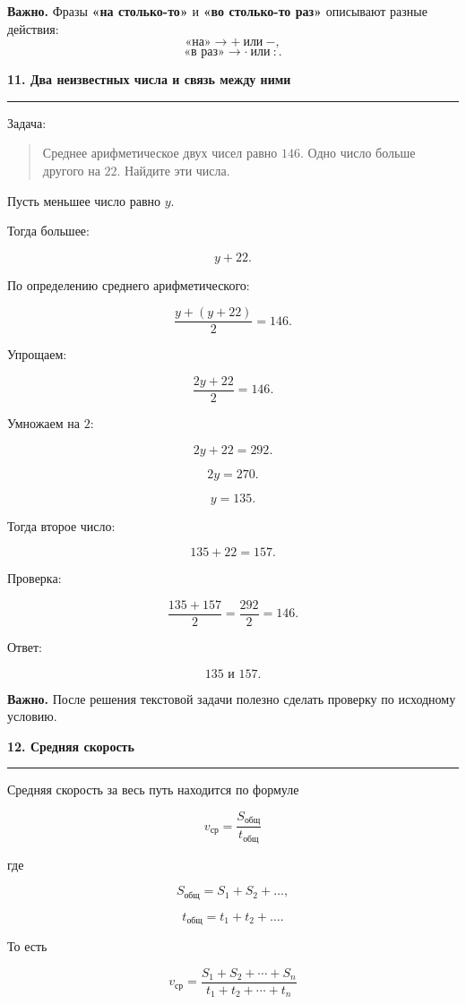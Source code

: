 \documentclass[a4paper,12pt]{article}
\newcommand{\topic}[1]{%
  \vspace{0.7em}
  {\Large\bfseries\color{darkaccent}#1}\par
  \vspace{0.25em}
  {\color{accent}\rule{\linewidth}{0.5pt}}
  \vspace{0.55em}
}
\newcommand{\important}[1]{%
  \par
  \vspace{0.25em}
  \noindent
  \textcolor{darkaccent}{\textbf{Важно.}} #1
  \par
}
\begin{document}
\important{
Фразы \textbf{«на столько-то»} и \textbf{«во столько-то раз»}
описывают разные действия:
\[
\text{«на»} \longrightarrow +\ \text{или}\ -,
\]
\[
\text{«в раз»} \longrightarrow \cdot\ \text{или}\ :.
\]
}

\topic{11. Два неизвестных числа и связь между ними}

Задача:

\begin{quote}
Среднее арифметическое двух чисел равно $146$.
Одно число больше другого на $22$.
Найдите эти числа.
\end{quote}

Пусть меньшее число равно $y$.

Тогда большее:

\[
y+22.
\]

По определению среднего арифметического:

\[
\frac{y+(y+22)}{2}=146.
\]

Упрощаем:

\[
\frac{2y+22}{2}=146.
\]

Умножаем на $2$:

\[
2y+22=292.
\]

\[
2y=270.
\]

\[
y=135.
\]

Тогда второе число:

\[
135+22=157.
\]

Проверка:

\[
\frac{135+157}{2}
=
\frac{292}{2}
=
146.
\]

Ответ:

\[
\boxed{135\text{ и }157}.
\]

\important{
После решения текстовой задачи полезно сделать проверку по исходному условию.
}

\topic{12. Средняя скорость}

Средняя скорость за весь путь находится по формуле

\[
\boxed{
v_{\text{ср}}
=
\frac{S_{\text{общ}}}{t_{\text{общ}}}
}
\]

где

\[
S_{\text{общ}}
=
S_1+S_2+\ldots,
\]

\[
t_{\text{общ}}
=
t_1+t_2+\ldots.
\]

То есть

\[
\boxed{
v_{\text{ср}}
=
\frac{S_1+S_2+\cdots+S_n}
     {t_1+t_2+\cdots+t_n}
}
\]
\end{document}
